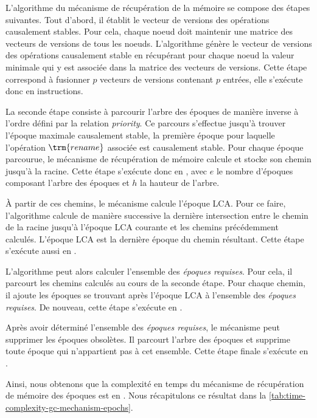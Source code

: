 L'algorithme du mécanisme de récupération de la mémoire se compose des étapes suivantes.
Tout d'abord, il établit le vecteur de versions des opérations causalement stables.
Pour cela, chaque noeud doit maintenir une matrice des vecteurs de versions de tous les noeuds.
L'algorithme génère le vecteur de versions des opérations causalement stable en récupérant pour chaque noeud la valeur minimale qui y est associée dans la matrice des vecteurs de versions.
Cette étape correspond à fusionner $p$ vecteurs de versions contenant $p$ entrées, elle s'exécute donc en  instructions.

La seconde étape consiste à parcourir l'arbre des époques de manière inverse à l'ordre défini par la relation \emph{priority}.
Ce parcours s'effectue jusqu'à trouver l'époque maximale causalement stable, \ie la première époque pour laquelle l'opération $\trm{rename}$ associée est causalement stable.
Pour chaque époque parcourue, le mécanisme de récupération de mémoire calcule et stocke son chemin jusqu'à la racine.
Cette étape s'exécute donc en , avec $e$ le nombre d'époques composant l'arbre des époques et $h$ la hauteur de l'arbre.

À partir de ces chemins, le mécanisme calcule l'époque \ac{LCA}.
Pour ce faire, l'algorithme calcule de manière successive la dernière intersection entre le chemin de la racine jusqu'à l'époque \ac{LCA} courante et les chemins précédemment calculés.
L'époque \ac{LCA} est la dernière époque du chemin résultant.
Cette étape s'exécute aussi en .

L'algorithme peut alors calculer l'ensemble des \emph{époques requises}.
Pour cela, il parcourt les chemins calculés au cours de la seconde étape.
Pour chaque chemin, il ajoute les époques se trouvant après l'époque \ac{LCA} à l'ensemble des \emph{époques requises}.
De nouveau, cette étape s'exécute en .

Après avoir déterminé l'ensemble des \emph{époques requises}, le mécanisme peut supprimer les époques obsolètes.
Il parcourt l'arbre des époques et supprime toute époque qui n'appartient pas à cet ensemble.
Cette étape finale s'exécute en .

Ainsi, nous obtenons que la complexité en temps du mécanisme de récupération de mémoire des époques est en .
Nous récapitulons ce résultat dans la \autoref{tab:time-complexity-gc-mechanism-epochs}.

